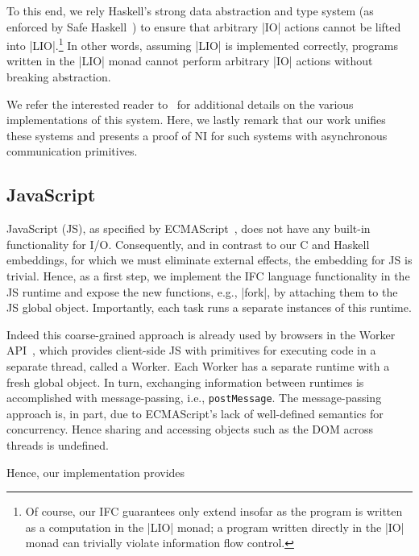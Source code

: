 To this end, we rely Haskell's strong data abstraction and type system
(as enforced by Safe Haskell~\cite{Terei:2012:SH:2364506.2364524}) to
ensure that arbitrary |IO| actions cannot be lifted into
|LIO|.\footnote{
Of course, our IFC guarantees only extend insofar as the program is
written as a computation in the |LIO| monad; a program written
directly in the |IO| monad can trivially violate information flow
control.
}
%
In other words, assuming |LIO| is implemented correctly, programs
written in the |LIO| monad cannot perform arbitrary |IO| actions
without breaking abstraction.
 
We refer the interested reader to~ for
additional details on the various implementations of this system.
%
Here, we lastly remark that our work unifies these systems and
presents a proof of NI for such systems with asynchronous
communication primitives.


\subsection{JavaScript}
\label{sec:real:js}

JavaScript (JS), as specified by ECMAScript~\tocite{}, does not have any
built-in functionality for I/O.
%
Consequently, and in contrast to our C and Haskell embeddings, for
which we must eliminate external effects, the embedding for JS is
trivial.
%
Hence, as a first step, we implement the IFC language functionality in the
JS runtime and expose the new functions, e.g., |fork|, by attaching
them to the JS global object.
%
Importantly, each task runs a separate instances of this runtime.

Indeed this coarse-grained approach is already used by browsers in the
Worker API~\tocite{}, which provides client-side JS with primitives
for executing code in a separate thread, called a Worker.
%
Each Worker has a separate runtime with a fresh global object.
%
In turn, exchanging information between runtimes is accomplished with
message-passing, i.e., \texttt{postMessage}.
%
The message-passing approach is, in part, due to ECMAScript's lack
of well-defined semantics for concurrency.
%
Hence sharing and accessing objects such as the DOM across threads is
undefined.
%

Hence, our implementation provides 

